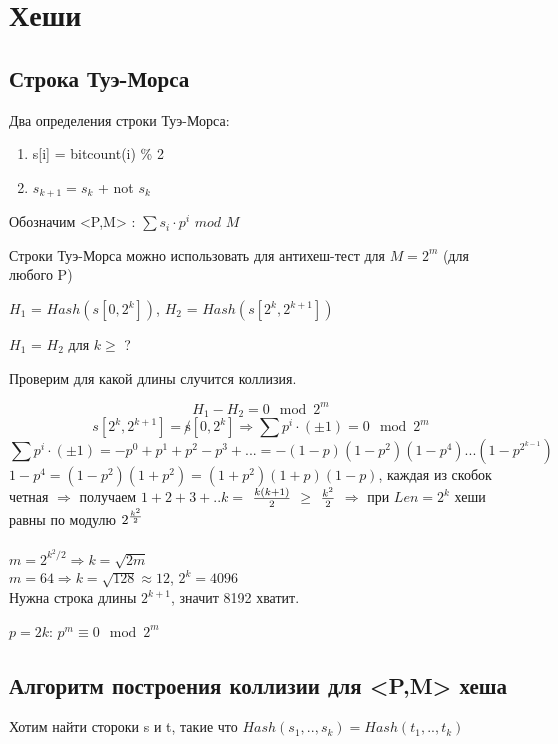 ﻿
\section{Хеши}
\subsection{Строка Туэ-Морса}

\begin{Def} 
   Два определения строки Туэ-Морса:
   \begin{enumerate}
       \item s[i] = bitcount(i) \% 2
       \item $s_{k+1} = s_k$ + not $s_k$
   \end{enumerate} 
\end{Def}


Обозначим <P,M> : $\sum s_i \cdot p^i $ $mod $ $M$ 

Строки Туэ-Морса можно использовать для антихеш-тест для  $M = 2^{m}$ (для любого P)


$H_1$ = $Hash(s[0,2^k])$, $H_2$ = $Hash(s[2^k,2^{k+1}])$ 

$H_1$ = $H_2$ для $k \ge$ ? 

Проверим для какой длины случится коллизия.

$$H_1 - H_2 = 0 \mod 2^m$$
$$s[2^k,2^{k+1}] = \not s[0,2^k] \Rightarrow \sum p^i \cdot (\pm1) = 0 \mod 2^{m}$$  
$$\sum p^i \cdot (\pm1) = -p^0 + p^1 + p^2 - p^3 + ... = -(1-p)(1-p^2)(1-p^4)...(1 - p^{2^{k-1}})$$
$1-p^4 = (1-p^2)(1+p^2) = (1+p^2)(1+p)(1-p)$, каждая из скобок четная $\Rightarrow $ получаем $1+2+3+..k = $ $k(k+1)\over{2}$ $ \ge$ $k^2\over{2}$ $\Rightarrow $ при $Len = 2^k$ хеши равны по модулю $2^{k^2\over{2}}$\\\\
$m = 2^{k^2/2} \Rightarrow k = \sqrt{2m}$ \\
$m = 64 \Rightarrow k = \sqrt{128} \approx 12$, $2^k = 4096$\\
Нужна строка длины $2^{k+1}$, значит 8192 хватит. \\
\begin{Rem}
    $p = 2k$: $p^m \equiv 0 \mod 2^m$ 
\end{Rem}

\subsection{Алгоритм построения коллизии для <P,M> хеша}
Хотим найти стороки s и t, такие что $Hash(s_1,..,s_k) = Hash(t_1,..,t_k)$
 
